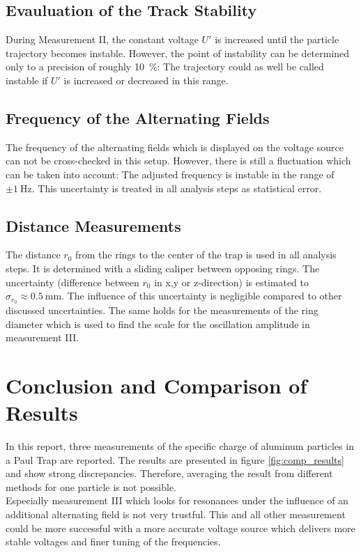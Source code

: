 \documentclass[
	paper=A4,
	parskip=full,
	chapterprefix=true,
	11pt,
	headings=normal,
	bibliography=totoc,
	listof=totoc,
	titlepage=on,
]{scrreprt}
\begin{document}
\section{Evauluation of the Track Stability}
During Measurement II, the constant voltage $U'$ is increased until the particle trajectory becomes instable. However, the point of instability can be determined only to a precision of roughly \SI{10}{\percent}: The trajectory could as well be called instable if $U'$ is increased or decreased in this range. 
 
\section{Frequency of the Alternating Fields}
The frequency of the alternating fields which is displayed on the voltage source can not be cross-checked in this setup. However, there is still a fluctuation which can be taken into account: The adjusted frequency is instable in the range of $\pm \SI{1}{\hertz}$. This uncertainty is treated in all analysis steps as statistical error. 

\section{Distance Measurements}
The distance $r_0$ from the rings to the center of the trap is used in all analysis steps. It is determined with a sliding caliper between opposing rings. The uncertainty (difference between $r_0$ in x,y or z-direction) is estimated to $\sigma_{r_0} \approx \SI{0.5}{\milli \meter}$. The influence of this uncertainty is negligible compared to other discussed uncertainties. The same holds for the measurements of the ring diameter which is used to find the scale for the oscillation amplitude in measurement III.

\chapter{Conclusion and Comparison of Results}

In this report, three measurements of the specific charge of aluminum particles in a Paul Trap are reported. The results are presented in figure \ref{fig:comp_results} and show strong discrepancies. Therefore, averaging the result from different methods for one particle is not possible. \\
Especially measurement III which looks for resonances under the influence of an additional alternating field is not very trustful. This and all other measurement could be more successful with a more accurate voltage source which delivers more stable voltages and finer tuning of the frequencies.
\end{document}
